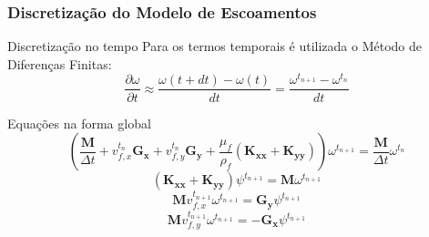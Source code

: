 \documentclass{beamer}
\begin{document}
\begin{frame}
  \frametitle{Discretização do Modelo de Escoamentos}
  
  \begin{block}{Discretização no tempo}
    Para os termos temporais é utilizada o Método de Diferenças Finitas:
    \begin{equation*}
      \dfrac{\partial \omega}{\partial t} \approx
      \frac{
	  \omega(t + dt) -
	  \omega(t)
      }{dt}
      =
      \frac{
	  \omega^{t_{n+1}} -
	  \omega^{t_{n}}
      }{dt}
    \end{equation*}
  \end{block}
  
  \begin{block}{Equações na forma global}
    \begin{equation*}
      \left(
	  \dfrac{\mathbf{M}}{\Delta t} + v_{f,x}^{t_{n}} \mathbf{G_x} + v_{f,y}^{t_{n}} \mathbf{G_y} + \dfrac{\mu_f}{\rho_f}
	  \left( \mathbf{K_{xx}} + \mathbf{K_{yy}} \right)
      \right)
      \omega^{t_{n+1}} = \dfrac{\mathbf{M}}{\Delta t} \omega^{t_{n}}
      \label{last_w}
    \end{equation*}
    \begin{equation*}
      \left( \mathbf{K_{xx}} + \mathbf{K_{yy}} \right)
      \psi^{t_{n+1}} = \mathbf{M} \omega^{t_{n+1}}
      \label{last_psi}
    \end{equation*}
    \begin{equation*}
      \mathbf{M} v_{f,x}^{t_{n+1}} \omega^{t_{n+1}} =
      \mathbf{G_y} \psi^{t_{n+1}}
      \label{last_vx}
    \end{equation*}
    \begin{equation*}
      \mathbf{M} v_{f,y}^{t_{n+1}} \omega^{t_{n+1}} = 
      -\mathbf{G_x} \psi^{t_{n+1}}
      \label{last_vy}
    \end{equation*}
  \end{block}
\end{frame}

\end{document}
